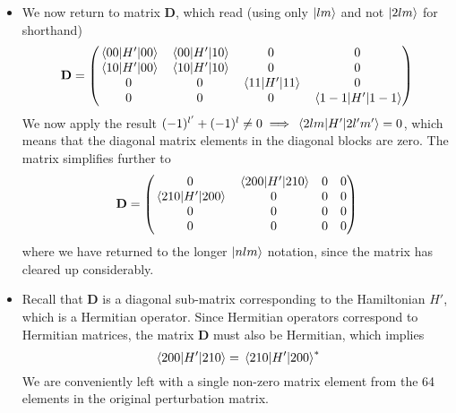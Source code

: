 \documentclass[11pt, a4paper]{article}
\newcommand{\mat}[1]{\mathbf{#1}} %
\begin{document}
\begin{itemize}
	
	\item We now return to matrix $ \mat{D} $, which read (using only $ \ket{lm} $ and not $ \ket{2lm} $ for shorthand)
	\begin{equation*}
		\mat{D} =
		\begin{pmatrix}
			\mel{00}{H'}{00} & \mel{00}{H'}{10} & 0 & 0\\
			\mel{10}{H'}{00} & \mel{10}{H'}{10} & 0 & 0\\
			0 & 0 & \mel{11}{H'}{11} & 0 \\
			0 & 0 & 0 & \mel{1-1}{H'}{1-1}
		\end{pmatrix}
	\end{equation*}
	We now apply the result $ (-1)^{l'} + (-1)^{l} \neq 0 \implies \mel{2lm}{H'}{2l'm'} = 0 $, which means that the diagonal matrix elements in the diagonal blocks are zero. The matrix simplifies further to
	\begin{equation*}
		\mat{D} =
		\begin{pmatrix}
			0 & \mel{200}{H'}{210} & 0 & 0\\
			\mel{210}{H'}{200} & 0 & 0 & 0\\
			0 & 0 & 0 & 0 \\
			0 & 0 & 0 & 0
		\end{pmatrix}
	\end{equation*}
	where we have returned to the longer $ \ket{nlm} $ notation, since the matrix has cleared up considerably. 
	
	\item Recall that $ \mat{D} $ is a diagonal sub-matrix corresponding to the Hamiltonian $ H' $, which is a Hermitian operator. Since Hermitian operators correspond to Hermitian matrices, the matrix $ \mat{D} $ must also be Hermitian, which implies
	\begin{equation*}
		\mel{200}{H'}{210} = \mel{210}{H'}{200}^{*}
	\end{equation*}
	We are conveniently left with a single non-zero matrix element from the 64 elements in the original perturbation matrix.
	

\end{itemize}
\end{document}
